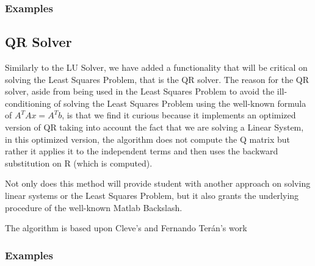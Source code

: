\subsubsection{Examples}
	

\subsection{QR Solver}
Similarly to the LU Solver, we have added a functionality that will be critical on solving the Least Squares Problem, that is the QR solver. The reason for the QR solver, aside from being used in the Least Squares Problem to avoid the ill-conditioning of solving the Least Squares Problem using the well-known formula of $A^T A x= A^T b$, is that we find it curious because it implements an optimized version of QR taking into account the fact that we are solving a Linear System, in this optimized version, the algorithm does not compute the Q matrix but rather it applies it to the independent terms and then uses the backward substitution on R (which is computed).

Not only does this method will provide student with another approach on solving linear systems or the Least Squares Problem, but it also grants the underlying procedure of the well-known Matlab Backslash.

The algorithm is based upon Cleve's and Fernando Terán's work~\cite{Vergara, doi:10.1137/1.9780898717952}
\subsubsection{Examples}



